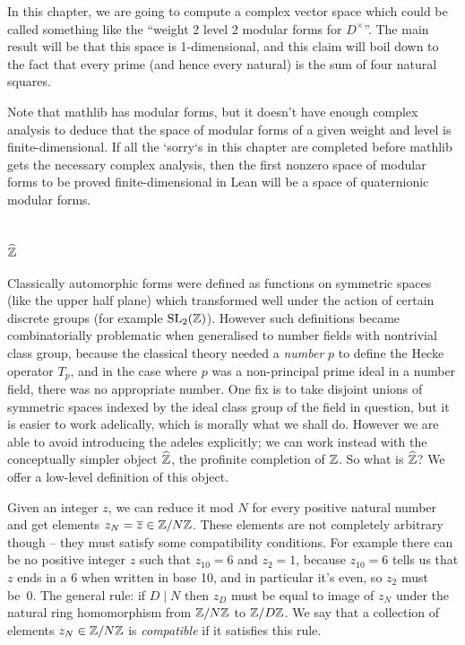 In this chapter, we are going to compute a complex vector space which could be called something
like the ``weight 2 level 2 modular forms for $D^\times$''. The main result will be that this
space is 1-dimensional, and this claim will
boil down to the fact that every prime (and hence every natural) is the sum of four
natural squares.

Note that mathlib has modular forms, but it doesn't have enough complex analysis to deduce
that the space of modular forms of a given weight and level is finite-dimensional. If all
the `sorry`s in this chapter are completed
before mathlib gets the necessary complex analysis, then the first nonzero space of modular forms
to be proved finite-dimensional in Lean will be a space of quaternionic modular forms.

\section{$\widehat{\mathbb{Z}}$}

Classically automorphic forms were defined as functions on symmetric spaces (like the upper half
plane) which transformed well under the action of certain discrete groups (for example $\operatorname{SL}_2(\mathbb{Z})$).
However such definitions became combinatorially problematic when generalised to number fields 
with nontrivial class group, because the classical theory needed a \emph{number} $p$ to define
the Hecke operator $T_p$, and in the case where $p$ was a non-principal prime ideal in a number
field, there was no appropriate number. One fix is to take disjoint unions of symmetric spaces
indexed by the ideal class group of the field in question, but it is easier to work adelically,
which is morally what we shall do. However we are able to avoid introducing the adeles
explicitly; we can work instead with the conceptually simpler object $\widehat{\mathbb{Z}}$, 
the profinite completion of $\mathbb{Z}$. So what is $\widehat{\mathbb{Z}}$? We offer a low-level definition of this object. 

Given an integer $z$, we can reduce it mod $N$ for every positive natural
number and get elements $z_N=\overline{z}\in\mathbb{Z}/N\mathbb{Z}$. These elements are not completely arbitrary
though -- they must satisfy some compatibility conditions. For example there can be no
positive integer $z$ such that $z_{10}=6$ and $z_2=1$, because $z_{10}=6$ tells us that
$z$ ends in a 6 when written in base 10, and in particular it's even, so $z_2$ must be~0.
The general rule: if $D\mid N$ then $z_D$ must be equal to image of $z_N$ under the natural 
ring homomorphism from $\mathbb{Z}/N\mathbb{Z}$ to $\mathbb{Z}/D\mathbb{Z}$. We say that a collection of elements 
$z_N\in\mathbb{Z}/N\mathbb{Z}$ is \emph{compatible} if it satisfies this rule.

